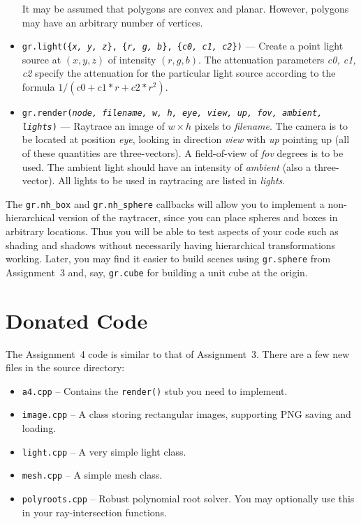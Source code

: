 \begin{itemize}
		It may be assumed that polygons are convex and planar.
		However, polygons may have an arbitrary number of vertices.
	\item \texttt{gr.light(\{\textit{x, y, z}\}, \{\textit{r, g, b}\}, 
		    \{\textit{c0, c1, c2}\})} ---
		Create a point 
		light source at $(x,y,z)$ of intensity $(r,g,b)$.
		The attenuation parameters \textit{c0, c1, c2} 
		specify the attenuation for the particular light source
		according to the formula $1/(c0+c1*r+c2*r^2)$.
        \item \texttt{gr.render(\textit{node, filename, w, h,
                      eye, view, up, fov,
                      ambient, lights})} ---
                  Raytrace an image of $w \times h$ pixels to
                  \textit{filename}. The camera is to be located at position
                  \textit{eye}, looking in direction \textit{view} with
                  \textit{up} pointing up (all of these quantities are
                  three-vectors). A field-of-view of \textit{fov}
                  degrees is to be used. The ambient light should have
                  an intensity of \textit{ambient} (also a
                  three-vector). All lights to be used in raytracing
                  are listed in \textit{lights}.
\end{itemize}

The \texttt{gr.nh\_box} and \texttt{gr.nh\_sphere} callbacks
will allow you to implement a non-hierarchical version of the 
raytracer, since you can place spheres and boxes in arbitrary locations.
Thus you will be able to test aspects of your code such as shading 
and shadows without necessarily having hierarchical transformations
working.  Later, you may find it easier to build scenes  using 
\texttt{gr.sphere} from Assignment~3 and, say, \texttt{gr.cube} for
building a unit cube at the origin.

\section{Donated Code}
The Assignment~4 code is similar to that of Assignment~3. There are a
few new files in the source directory:

\begin{itemize}
  \item \texttt{a4.cpp} -- Contains the \texttt{render()} stub you
    need to implement.
  \item \texttt{image.cpp} -- A class storing rectangular images,
    supporting PNG saving and loading.
  \item \texttt{light.cpp} -- A very simple light class.
  \item \texttt{mesh.cpp} -- A simple mesh class.
  \item \texttt{polyroots.cpp} -- Robust polynomial root solver. You
    may optionally use this in your ray-intersection functions.
\end{itemize}

